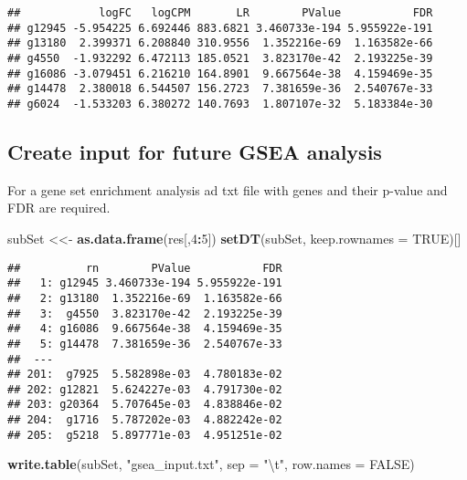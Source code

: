\documentclass[]{article}
\newenvironment{Shaded}{\begin{snugshade}}{\end{snugshade}}
\newcommand{\KeywordTok}[1]{\textcolor[rgb]{0.13,0.29,0.53}{\textbf{#1}}}
\newcommand{\DataTypeTok}[1]{\textcolor[rgb]{0.13,0.29,0.53}{#1}}
\newcommand{\DecValTok}[1]{\textcolor[rgb]{0.00,0.00,0.81}{#1}}
\newcommand{\CharTok}[1]{\textcolor[rgb]{0.31,0.60,0.02}{#1}}
\newcommand{\StringTok}[1]{\textcolor[rgb]{0.31,0.60,0.02}{#1}}
\newcommand{\OtherTok}[1]{\textcolor[rgb]{0.56,0.35,0.01}{#1}}
\newcommand{\OperatorTok}[1]{\textcolor[rgb]{0.81,0.36,0.00}{\textbf{#1}}}
\newcommand{\NormalTok}[1]{#1}
\begin{document}
\begin{verbatim}
##            logFC   logCPM       LR        PValue           FDR
## g12945 -5.954225 6.692446 883.6821 3.460733e-194 5.955922e-191
## g13180  2.399371 6.208840 310.9556  1.352216e-69  1.163582e-66
## g4550  -1.932292 6.472113 185.0521  3.823170e-42  2.193225e-39
## g16086 -3.079451 6.216210 164.8901  9.667564e-38  4.159469e-35
## g14478  2.380018 6.544507 156.2723  7.381659e-36  2.540767e-33
## g6024  -1.533203 6.380272 140.7693  1.807107e-32  5.183384e-30
\end{verbatim}

\subsection{Create input for future GSEA
analysis}\label{create-input-for-future-gsea-analysis}

For a gene set enrichment analysis ad txt file with genes and their
p-value and FDR are required.

\begin{Shaded}
\begin{Highlighting}[]
\NormalTok{  subSet <<-}\StringTok{ }\KeywordTok{as.data.frame}\NormalTok{(res[,}\DecValTok{4}\OperatorTok{:}\DecValTok{5}\NormalTok{])}
  \KeywordTok{setDT}\NormalTok{(subSet, }\DataTypeTok{keep.rownames =} \OtherTok{TRUE}\NormalTok{)[]}
\end{Highlighting}
\end{Shaded}

\begin{verbatim}
##          rn        PValue           FDR
##   1: g12945 3.460733e-194 5.955922e-191
##   2: g13180  1.352216e-69  1.163582e-66
##   3:  g4550  3.823170e-42  2.193225e-39
##   4: g16086  9.667564e-38  4.159469e-35
##   5: g14478  7.381659e-36  2.540767e-33
##  ---                                   
## 201:  g7925  5.582898e-03  4.780183e-02
## 202: g12821  5.624227e-03  4.791730e-02
## 203: g20364  5.707645e-03  4.838846e-02
## 204:  g1716  5.787202e-03  4.882242e-02
## 205:  g5218  5.897771e-03  4.951251e-02
\end{verbatim}

\begin{Shaded}
\begin{Highlighting}[]
  \KeywordTok{write.table}\NormalTok{(subSet, }\StringTok{"gsea_input.txt"}\NormalTok{, }\DataTypeTok{sep =} \StringTok{"}\CharTok{\textbackslash{}t}\StringTok{"}\NormalTok{, }\DataTypeTok{row.names =} \OtherTok{FALSE}\NormalTok{)}
\end{Highlighting}
\end{Shaded}
\end{document}
